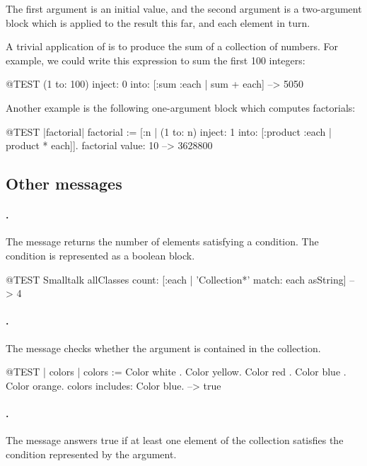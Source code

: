 \documentclass[a4paper,10pt,twoside]{book}
\begin{document}
The first argument is an initial value, and the second argument is a two-argument block which is applied to the result this far, and each element in turn.

A trivial application of  is to produce the sum of a collection of numbers.
For example, we could write this expression to sum the first 100 integers:
\begin{code}{@TEST}
(1 to: 100) inject: 0 into: [:sum :each | sum + each] --> 5050
\end{code}

Another example is the following one-argument block which computes factorials:
\begin{code}{@TEST |factorial|}
factorial := [:n | (1 to: n) inject: 1 into: [:product :each | product * each]].
factorial value: 10 --> 3628800
\end{code}

\subsection{Other messages}

\paragraph{.}
The message  returns the number of elements satisfying a condition.
The condition is represented as a boolean block.

\begin{code}{@TEST}
Smalltalk allClasses count: [:each | 'Collection*' match: each asString] --> 4
\end{code}

\paragraph{.}
The message  checks whether the argument is contained in the collection.

\begin{code}{@TEST | colors |}
colors := {Color white . Color yellow. Color red . Color blue . Color orange}.
colors includes: Color blue. --> true
\end{code}

\paragraph{.}
The message  answers true if at least one element of the collection satisfies the condition represented by the argument.
\end{document}
